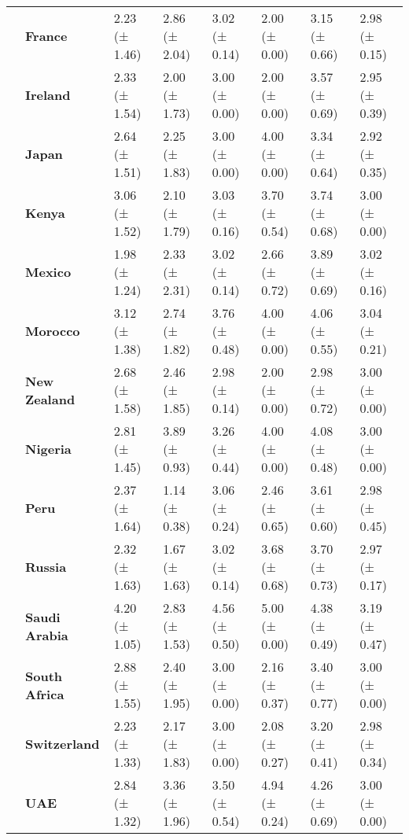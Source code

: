 \begin{tabular}{llllllll}
\textbf{} & \textbf{France} & 2.23 (± 1.46) & 2.86 (± 2.04) & 3.02 (± 0.14) & 2.00 (± 0.00) & 3.15 (± 0.66) & 2.98 (± 0.15) \\
\textbf{} & \textbf{Ireland} & 2.33 (± 1.54) & 2.00 (± 1.73) & 3.00 (± 0.00) & 2.00 (± 0.00) & 3.57 (± 0.69) & 2.95 (± 0.39) \\
\textbf{} & \textbf{Japan} & 2.64 (± 1.51) & 2.25 (± 1.83) & 3.00 (± 0.00) & 4.00 (± 0.00) & 3.34 (± 0.64) & 2.92 (± 0.35) \\
\textbf{} & \textbf{Kenya} & 3.06 (± 1.52) & 2.10 (± 1.79) & 3.03 (± 0.16) & 3.70 (± 0.54) & 3.74 (± 0.68) & 3.00 (± 0.00) \\
\textbf{} & \textbf{Mexico} & 1.98 (± 1.24) & 2.33 (± 2.31) & 3.02 (± 0.14) & 2.66 (± 0.72) & 3.89 (± 0.69) & 3.02 (± 0.16) \\
\textbf{} & \textbf{Morocco} & 3.12 (± 1.38) & 2.74 (± 1.82) & 3.76 (± 0.48) & 4.00 (± 0.00) & 4.06 (± 0.55) & 3.04 (± 0.21) \\
\textbf{} & \textbf{New Zealand} & 2.68 (± 1.58) & 2.46 (± 1.85) & 2.98 (± 0.14) & 2.00 (± 0.00) & 2.98 (± 0.72) & 3.00 (± 0.00) \\
\textbf{} & \textbf{Nigeria} & 2.81 (± 1.45) & 3.89 (± 0.93) & 3.26 (± 0.44) & 4.00 (± 0.00) & 4.08 (± 0.48) & 3.00 (± 0.00) \\
\textbf{} & \textbf{Peru} & 2.37 (± 1.64) & 1.14 (± 0.38) & 3.06 (± 0.24) & 2.46 (± 0.65) & 3.61 (± 0.60) & 2.98 (± 0.45) \\
\textbf{} & \textbf{Russia} & 2.32 (± 1.63) & 1.67 (± 1.63) & 3.02 (± 0.14) & 3.68 (± 0.68) & 3.70 (± 0.73) & 2.97 (± 0.17) \\
\textbf{} & \textbf{Saudi Arabia} & 4.20 (± 1.05) & 2.83 (± 1.53) & 4.56 (± 0.50) & 5.00 (± 0.00) & 4.38 (± 0.49) & 3.19 (± 0.47) \\
\textbf{} & \textbf{South Africa} & 2.88 (± 1.55) & 2.40 (± 1.95) & 3.00 (± 0.00) & 2.16 (± 0.37) & 3.40 (± 0.77) & 3.00 (± 0.00) \\
\textbf{} & \textbf{Switzerland} & 2.23 (± 1.33) & 2.17 (± 1.83) & 3.00 (± 0.00) & 2.08 (± 0.27) & 3.20 (± 0.41) & 2.98 (± 0.34) \\
\textbf{} & \textbf{UAE} & 2.84 (± 1.32) & 3.36 (± 1.96) & 3.50 (± 0.54) & 4.94 (± 0.24) & 4.26 (± 0.69) & 3.00 (± 0.00) \\
\cline{1-8}
\bottomrule
\end{tabular}
